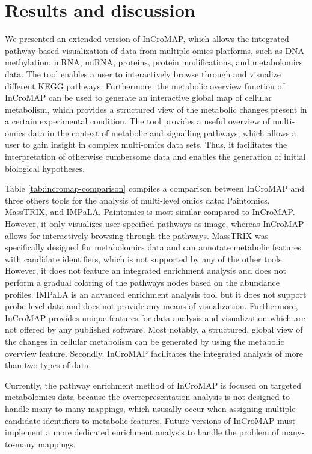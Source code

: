 \documentclass[final,5p,times,twocolumn]{elsarticle}
\newcommand\red[1]{{\color{red}#1}}
\begin{document}
\section{Results and discussion}
We presented an extended version of InCroMAP, which allows the integrated pathway-based visualization of data from multiple omics platforms, such as DNA methylation, mRNA, miRNA, proteins, protein modifications, and metabolomics data. The tool enables a user to interactively browse through and visualize different KEGG pathways. Furthermore, the metabolic overview function of InCroMAP can be used to generate an interactive global map of cellular metabolism, which provides a structured view of the metabolic changes present in a certain experimental condition. The tool provides a useful overview of multi-omics data in the context of metabolic and signalling pathways, which allows a user to gain insight in complex multi-omics data sets. Thus, it facilitates the interpretation of otherwise cumbersome data and enables the generation of initial biological hypotheses.

\red{Table \ref{tab:incromap-comparison} compiles a comparison between InCroMAP and three others tools for the analysis of multi-level omics data: Paintomics, MassTRIX, and IMPaLA. Paintomics is most similar compared to InCroMAP. However, it only visualizes user specified pathways as image, whereas InCroMAP allows for interactively browsing through the pathways. MassTRIX was specifically  designed for metabolomics data and can annotate metabolic features with candidate identifiers, which is not supported by any of the other tools. However, it does not feature an integrated enrichment analysis and does not perform a gradual coloring of the pathways nodes based on the abundance profiles. IMPaLA is an advanced enrichment analysis tool but it does not support probe-level data and does not provide any means of visualization. Furthermore, InCroMAP provides unique features for data analysis and visualization which are not offered by any published software.  Most notably, a structured, global view of the changes in cellular metabolism can be generated by using the metabolic overview feature. Secondly, InCroMAP facilitates the integrated analysis of more than two types of data.}

Currently, the pathway enrichment method of InCroMAP is \red{focused on targeted metabolomics data because the overrepresentation analysis is not designed to handle many-to-many mappings, which ususally occur when assigning multiple candidate identifiers to metabolic features. Future versions of InCroMAP must implement a more dedicated enrichment analysis to handle the problem of many-to-many mappings.}
\end{document}
